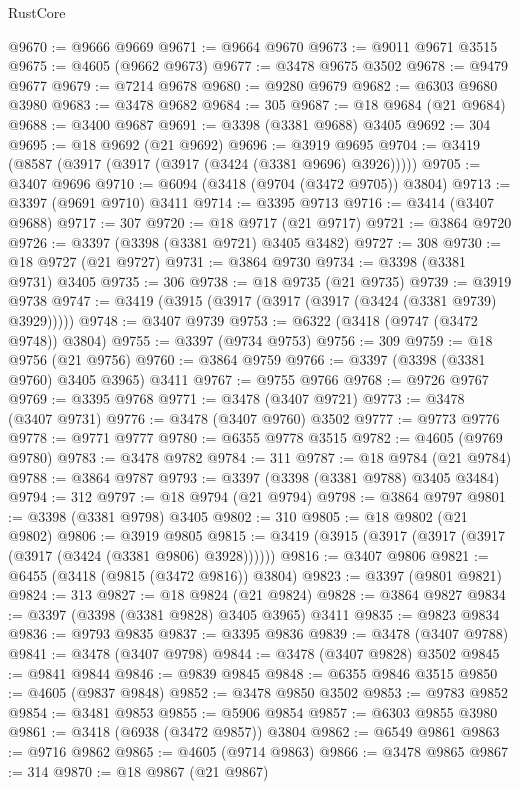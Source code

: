 \begin{lexlean}{RustCore}
\begin{coremodule}
@9670 := @9666 @9669
@9671 := @9664 @9670
@9673 := @9011 @9671 @3515
@9675 := @4605 (@9662 @9673)
@9677 := @3478 @9675 @3502
@9678 := @9479 @9677
@9679 := @7214 @9678
@9680 := @9280 @9679
@9682 := @6303 @9680 @3980
@9683 := @3478 @9682
@9684 := 305
@9687 := @18 @9684 (@21 @9684)
@9688 := @3400 @9687
@9691 := @3398 (@3381 @9688) @3405
@9692 := 304
@9695 := @18 @9692 (@21 @9692)
@9696 := @3919 @9695
@9704 := @3419 (@8587 (@3917 (@3917 (@3917 (@3424 (@3381 @9696) @3926)))))
@9705 := @3407 @9696
@9710 := @6094 (@3418 (@9704 (@3472 @9705)) @3804)
@9713 := @3397 (@9691 @9710) @3411
@9714 := @3395 @9713
@9716 := @3414 (@3407 @9688)
@9717 := 307
@9720 := @18 @9717 (@21 @9717)
@9721 := @3864 @9720
@9726 := @3397 (@3398 (@3381 @9721) @3405 @3482)
@9727 := 308
@9730 := @18 @9727 (@21 @9727)
@9731 := @3864 @9730
@9734 := @3398 (@3381 @9731) @3405
@9735 := 306
@9738 := @18 @9735 (@21 @9735)
@9739 := @3919 @9738
@9747 := @3419 (@3915 (@3917 (@3917 (@3917 (@3424 (@3381 @9739) @3929)))))
@9748 := @3407 @9739
@9753 := @6322 (@3418 (@9747 (@3472 @9748)) @3804)
@9755 := @3397 (@9734 @9753)
@9756 := 309
@9759 := @18 @9756 (@21 @9756)
@9760 := @3864 @9759
@9766 := @3397 (@3398 (@3381 @9760) @3405 @3965) @3411
@9767 := @9755 @9766
@9768 := @9726 @9767
@9769 := @3395 @9768
@9771 := @3478 (@3407 @9721)
@9773 := @3478 (@3407 @9731)
@9776 := @3478 (@3407 @9760) @3502
@9777 := @9773 @9776
@9778 := @9771 @9777
@9780 := @6355 @9778 @3515
@9782 := @4605 (@9769 @9780)
@9783 := @3478 @9782
@9784 := 311
@9787 := @18 @9784 (@21 @9784)
@9788 := @3864 @9787
@9793 := @3397 (@3398 (@3381 @9788) @3405 @3484)
@9794 := 312
@9797 := @18 @9794 (@21 @9794)
@9798 := @3864 @9797
@9801 := @3398 (@3381 @9798) @3405
@9802 := 310
@9805 := @18 @9802 (@21 @9802)
@9806 := @3919 @9805
@9815 := @3419 (@3915 (@3917 (@3917 (@3917 (@3917 (@3424 (@3381 @9806) @3928))))))
@9816 := @3407 @9806
@9821 := @6455 (@3418 (@9815 (@3472 @9816)) @3804)
@9823 := @3397 (@9801 @9821)
@9824 := 313
@9827 := @18 @9824 (@21 @9824)
@9828 := @3864 @9827
@9834 := @3397 (@3398 (@3381 @9828) @3405 @3965) @3411
@9835 := @9823 @9834
@9836 := @9793 @9835
@9837 := @3395 @9836
@9839 := @3478 (@3407 @9788)
@9841 := @3478 (@3407 @9798)
@9844 := @3478 (@3407 @9828) @3502
@9845 := @9841 @9844
@9846 := @9839 @9845
@9848 := @6355 @9846 @3515
@9850 := @4605 (@9837 @9848)
@9852 := @3478 @9850 @3502
@9853 := @9783 @9852
@9854 := @3481 @9853
@9855 := @5906 @9854
@9857 := @6303 @9855 @3980
@9861 := @3418 (@6938 (@3472 @9857)) @3804
@9862 := @6549 @9861
@9863 := @9716 @9862
@9865 := @4605 (@9714 @9863)
@9866 := @3478 @9865
@9867 := 314
@9870 := @18 @9867 (@21 @9867)

\end{coremodule}
\end{lexlean}
